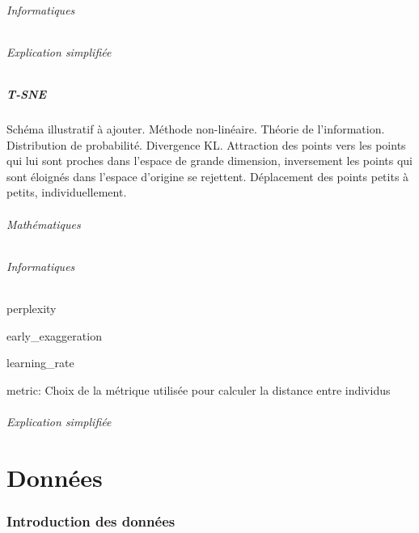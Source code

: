 \documentclass[12pt]{report}
\begin{document}
\paragraph{Informatiques}
\paragraph{Explication simplifiée}

\subsubsection{T-SNE}

Schéma illustratif à ajouter.
Méthode non-linéaire.
Théorie de l'information.
Distribution de probabilité.
Divergence KL.
Attraction des points vers les points qui lui sont proches dans l’espace de grande dimension, inversement les points qui sont éloignés dans l’espace d’origine se rejettent. Déplacement des points petits à petits, individuellement.

\paragraph{Mathématiques}
\paragraph{Informatiques}

perplexity 


early_exaggeration


learning_rate 


metric: Choix de la métrique utilisée pour calculer la distance entre individus 

\paragraph{Explication simplifiée}

\newpage
\part{Données}

\section{Introduction des données}
\end{document}
